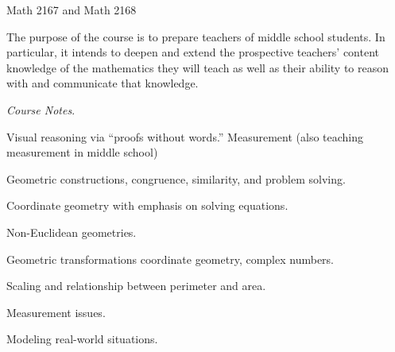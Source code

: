 \documentclass{osucourse}
\begin{document}
\CatalogDescription
\PrerequisitesAndExclusions

\begin{FollowupCourses}
Math 2167 and Math 2168
\end{FollowupCourses}

\begin{Purpose}
The purpose of the course is to prepare teachers of middle school students. In particular, it intends to deepen and extend the prospective teachers’ content knowledge of the mathematics they will teach as well as their ability to reason with and communicate that knowledge.
\end{Purpose}

\begin{Text}
\emph{Course Notes}.
\end{Text}

\begin{TopicsList}
\item Visual reasoning via “proofs without words.” Measurement (also teaching measurement in middle school)
\item Geometric constructions, congruence, similarity, and problem solving.
\item Coordinate geometry with emphasis on solving equations.
\item Non-Euclidean geometries.
\item Geometric transformations coordinate geometry, complex numbers.
\item Scaling and relationship between perimeter and area.
\item Measurement issues.
\item Modeling real-world situations.
\end{TopicsList}
\end{document}
